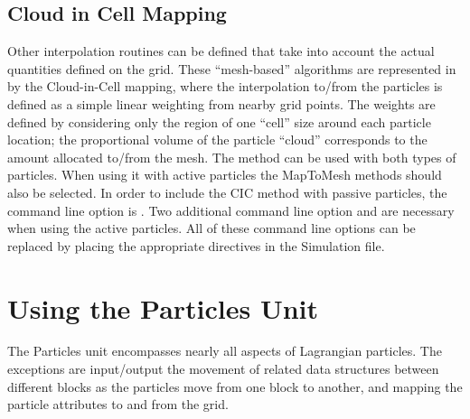 \subsection{Cloud in Cell Mapping}
\label{Sec:CIC}
Other interpolation routines can be defined that take into account
the actual quantities defined on the grid.  These ``mesh-based''
algorithms are represented in \flashx by the Cloud-in-Cell
mapping, where the interpolation to/from the particles is defined
as a simple linear weighting from nearby grid points.  The weights are
defined by considering only the region of one ``cell'' size around
each particle location; the proportional volume of the particle
``cloud'' corresponds to the amount allocated to/from the mesh. The
 method can be used with both types of particles. When using it
with active particles the MapToMesh methods should also be
selected. In order to include the CIC method with passive particles,
the  command line option is
. Two additional
command line option
 and
 are necessary 
when using the active particles. All of these command line options can
be replaced by placing the appropriate 
directives in the Simulation  file.

\section{Using the Particles Unit}
\label{Sec:ParticlesUsing}
The Particles unit encompasses nearly all aspects of Lagrangian
particles.  The exceptions are input/output
the movement of related data structures
between different blocks as the particles move from one block to
another, and 
mapping the particle attributes to and from the grid. 

